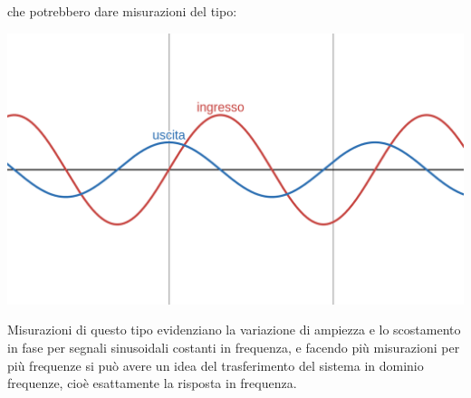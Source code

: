 \documentclass[a4paper,11pt]{article}
\begin{document}
\begin{center}
\end{center}

che potrebbero dare misurazioni del tipo:

\begin{center}
	\includegraphics[scale=0.3]{../figures/in_out_sin.png}
\end{center}

Misurazioni di questo tipo evidenziano la variazione di ampiezza e lo scostamento in fase per segnali sinusoidali costanti in frequenza, e facendo più misurazioni per più frequenze si può avere un idea del trasferimento del sistema in dominio frequenze, cioè esattamente la risposta in frequenza.
\end{document}
